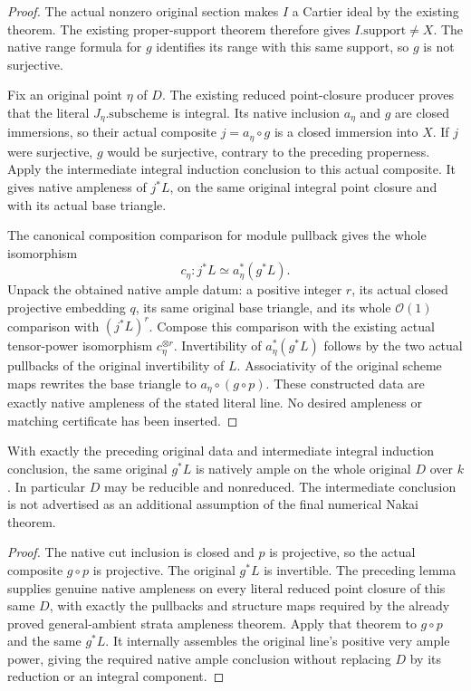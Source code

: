 \begin{proof}
The actual nonzero original section makes $I$ a Cartier ideal by the
existing theorem. The existing proper-support theorem therefore gives
$I.\mathrm{support}\ne X$. The native range formula for $g$ identifies
its range with this same support, so $g$ is not surjective.

Fix an original point $\eta$ of $D$. The existing reduced point-closure
producer proves that the literal $J_\eta.\mathrm{subscheme}$ is integral.
Its native inclusion $a_\eta$ and $g$ are closed immersions, so their
actual composite $j=a_\eta\circ g$ is a closed immersion into $X$.
If $j$ were surjective, $g$ would be surjective, contrary to the preceding
properness. Apply the intermediate integral induction conclusion to
this actual composite. It gives native ampleness of $j^*L$, on the
same original integral point closure and with its actual base triangle.

The canonical composition comparison for module pullback gives the
whole isomorphism
\[
 c_\eta:j^*L\simeq a_\eta^*(g^*L).
\]
Unpack the obtained native ample datum: a positive integer $r$, its
actual closed projective embedding $q$, its same original base triangle,
and its whole $\mathcal O(1)$ comparison with $(j^*L)^r$.
Compose this comparison with the existing actual tensor-power
isomorphism $c_\eta^{\otimes r}$. Invertibility of
$a_\eta^*(g^*L)$ follows by the two actual pullbacks of the original
invertibility of $L$. Associativity of the original scheme maps rewrites
the base triangle to $a_\eta\circ(g\circ p)$. These constructed data
are exactly native ampleness of the stated literal line. No desired
ampleness or matching certificate has been inserted.
\end{proof}

\begin{theorem}
\label{thm:seshadri-original-proper-cut-native-ampleness}
\leanok
{}
With exactly the preceding original data and intermediate integral
induction conclusion, the same original $g^*L$ is natively ample on the
whole original $D$ over $k$. In particular $D$ may be reducible and
nonreduced. The intermediate conclusion is not advertised as an
additional assumption of the final numerical Nakai theorem.
\end{theorem}
\begin{proof}
The native cut inclusion is closed and $p$ is projective, so the actual
composite $g\circ p$ is projective. The original $g^*L$ is invertible.
The preceding lemma supplies genuine native ampleness on every literal
reduced point closure of this same $D$, with exactly the pullbacks and
structure maps required by the already proved general-ambient strata
ampleness theorem. Apply that theorem to $g\circ p$ and the same
$g^*L$. It internally assembles the original line's positive very ample
power, giving the required native ample conclusion without replacing
$D$ by its reduction or an integral component.
\end{proof}
